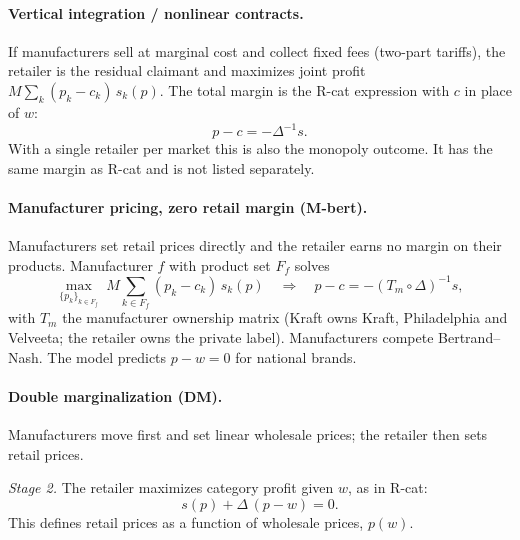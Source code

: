 \documentclass[11pt]{article}
\newcommand{\model}[1]{\textsf{#1}}
\begin{document}
\paragraph{Vertical integration / nonlinear contracts.} If manufacturers sell at marginal
cost and collect fixed fees (two-part tariffs), the retailer is the residual claimant and
maximizes joint profit $M \sum_k (p_k - c_k)\, s_k(p)$. The total margin is the
\model{R-cat} expression with $c$ in place of $w$:
\begin{equation}
  p - c = -\Delta^{-1} s .
\end{equation}
With a single retailer per market this is also the monopoly outcome. It has the same margin
as \model{R-cat} and is not listed separately.

\paragraph{Manufacturer pricing, zero retail margin (\model{M-bert}).} Manufacturers set
retail prices directly and the retailer earns no margin on their products. Manufacturer $f$
with product set $F_f$ solves
\begin{equation}
  \max_{\{p_k\}_{k \in F_f}} \; M \sum_{k \in F_f} (p_k - c_k)\, s_k(p)
  \quad\Longrightarrow\quad
  p - c = -\left( T_m \circ \Delta \right)^{-1} s ,
\end{equation}
with $T_m$ the manufacturer ownership matrix (Kraft owns Kraft, Philadelphia and Velveeta;
the retailer owns the private label). Manufacturers compete Bertrand--Nash. The model
predicts $p - w = 0$ for national brands.

\paragraph{Double marginalization (\model{DM}).} Manufacturers move first and set linear
wholesale prices; the retailer then sets retail prices.

\emph{Stage 2.} The retailer maximizes category profit given $w$, as in \model{R-cat}:
\begin{equation}
  s(p) + \Delta\, (p - w) = 0 .
  \label{eq:stage2}
\end{equation}
This defines retail prices as a function of wholesale prices, $p(w)$.
\end{document}
